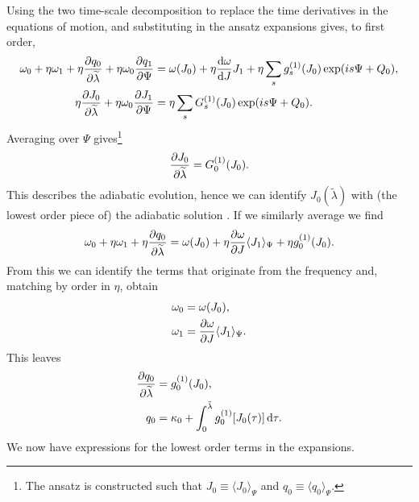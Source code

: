 Using the two time-scale decomposition to replace the time derivatives in the equations of motion, and substituting in the ansatz expansions gives, to first order,
\begin{subequations}
\begin{align}
\label{eq:q-1}
\omega_0 + \eta\omega_1 + \eta\dfrac{\partial {q_0}}{\partial {\widetilde{\lambda}}} + \eta\omega_0\dfrac{\partial {q_1}}{\partial {\Psi}} = {} & \omega(J_0) + \eta\dfrac{\mathrm{d} {\omega}}{\mathrm{d} {J}}J_1 + \eta \sum_s g_s^{(1)}(J_0)\exp(is \Psi + Q_0), \\
\eta\dfrac{\partial {J_0}}{\partial {\widetilde{\lambda}}} + \eta\omega_0\dfrac{\partial {J_1}}{\partial {\Psi}} = {} & \eta \sum_s G_s^{(1)}(J_0)\exp(is \Psi + Q_0).
\label{eq:J-1}
\end{align}
\end{subequations}
Averaging  over $\Psi$ gives\footnote{The ansatz is constructed such that $J_0 \equiv \langle J_0\rangle_\Psi$ and $q_0 \equiv \langle q_0\rangle_\Psi$.}
\begin{equation}
\dfrac{\partial {J_0}}{\partial {\widetilde{\lambda}}} = G_0^{(1)}(J_0).
\label{eq:J-ad}
\end{equation}
This describes the adiabatic evolution, hence we can identify $J_0\left(\widetilde{\lambda}\right)$ with (the lowest order piece of) the adiabatic solution \citep{Hinderer2008}. If we similarly average  we find
\begin{equation}
\omega_0 + \eta\omega_1 +\eta\dfrac{\partial {q_0}}{\partial {\widetilde{\lambda}}} = \omega(J_0) + \eta\dfrac{\partial {\omega}}{\partial {J}}\langle J_1\rangle_\Psi + \eta g_0^{(1)}(J_0).
\end{equation}
From this we can identify the terms that originate from the frequency and, matching by order in $\eta$, obtain
\begin{subequations}
\begin{align}
\omega_0 = {} & \omega(J_0), \\
\omega_1 = {} & \dfrac{\partial {\omega}}{\partial {J}}\langle J_1\rangle_\Psi.
\end{align}
\end{subequations}
This leaves
\begin{align}
\dfrac{\partial {q_0}}{\partial {\widetilde{\lambda}}} = {} & g_0^{(1)}(J_0), \\
q_0 = {} & \kappa_0 + \int_{0}^{\tilde{\lambda}}{g_0^{(1)}[J_0(\tau)]}\,\mathrm{d}{\tau}.
\label{eq:q-0-sol}
\end{align}
We now have expressions for the lowest order terms in the expansions.


